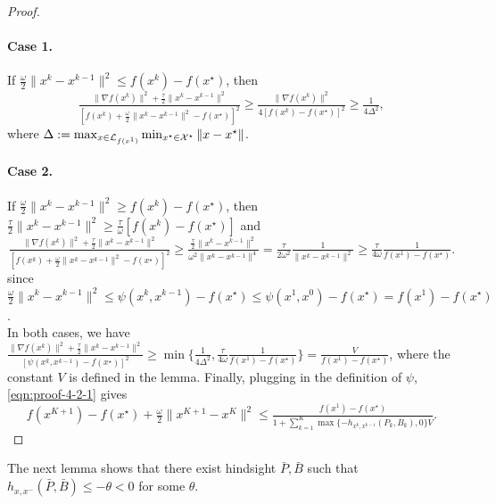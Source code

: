 \begin{proof}
\paragraph{Case 1.} If $\frac{\omega}{2} \| x^k - x^{k - 1} \|^2 \leq f (x^k) -
f (x^{\star})$, then
\begin{equation*}
\tfrac{\| \nabla f (x^k) \|^2 + \frac{\tau}{2} \| x^k - x^{k - 1} \|^2}{[ f (x^k) + \frac{\omega}{2} \| x^k - x^{k - 1} \|^2 - f(x^{\star}) ]^2} \geq \tfrac{\| \nabla f (x^k) \|^2}{4 [f (x^k) - f (x^{\star})]^2} \geq \tfrac{1}{4 \Delta^2},
\end{equation*}
where $\Delta := \max_{x \in \mathcal{L}_{f(x^1)}} \min_{x^{\star} \in \mathcal{X}^{\star}} \| x - x^{\star} \|$.

\paragraph{Case 2.} If $\frac{\omega}{2} \| x^k - x^{k - 1} \|^2 \geq f (x^k) -
f (x^{\star})$, then $\frac{\tau}{2} \| x^k - x^{k - 1} \|^2 \geq
\frac{\tau}{\omega} [f (x^k) - f (x^{\star})]$ and
\[ \tfrac{\| \nabla f (x^k) \|^2 + \frac{\tau}{2} \| x^k - x^{k - 1}
   \|^2}{[ f (x^k) + \frac{\omega}{2} \| x^k - x^{k - 1} \|^2 - f
   (x^{\star}) ]^2} \geq \tfrac{\frac{\tau}{2} \| x^k - x^{k - 1}
   \|^2}{\omega^2 \| x^k - x^{k - 1} \|^4} = \tfrac{\tau}{2 \omega^2}
   \tfrac{1}{\| x^k - x^{k - 1} \|^2} \geq \tfrac{\tau}{4 \omega} \tfrac{1}{f
   (x^1) - f (x^{\star})} . \]
since $\frac{\omega}{2} \| x^k - x^{k - 1} \|^2 \leq \psi (x^k, x^{k - 1})
- f (x^{\star}) \leq \psi (x^1, x^0) - f (x^{\star}) = f (x^1) - f
(x^{\star})$.\\

In both cases, we have $\tfrac{\| \nabla f (x^k) \|^2 + \frac{\tau}{2} \| x^k
- x^{k - 1} \|^2}{[\psi (x^k, x^{k - 1}) - f (x^{\star})]^2} \geq \min
\{ \tfrac{1}{4 \Delta^2}, \frac{\tau}{4 \omega} \tfrac{1}{f (x^1) - f (x^{\star})} \} = \tfrac{V}{f(x^1) - f(x^\star)}$, where the constant $V$ is defined in the lemma.
Finally, plugging in the definition of $\psi$, \eqref{eqn:proof-4-2-1} gives
\[f(x^{K+1}) - f(x^{\star}) + \tfrac{\omega}{2} \|x^{K+1} - x^K\|^2 \leq \tfrac{f (x^1) - f (x^{\star})}{1 + \sum_{k = 1}^K
\max \{ - h_{x^k, x^{k - 1}} (P_k, B_k), 0 \} V}.\]
\end{proof}
The next lemma shows that there exist hindsight $\bar{P}, \bar{B}$ such that $h_{x, x^-} (\bar{P}, \bar{B}) \leq - \theta < 0$ for some $\theta$.

